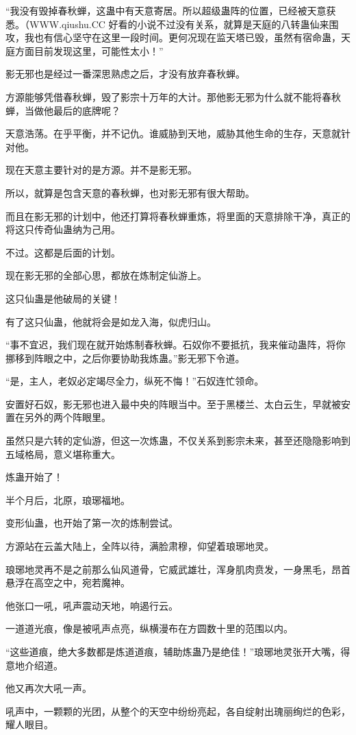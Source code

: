 \begin{this_body}
“我没有毁掉春秋蝉，这蛊中有天意寄居。所以超级蛊阵的位置，已经被天意获悉。（WWW.qiushu.CC 好看的小说不过没有关系，就算是天庭的八转蛊仙来围攻，我也有信心坚守在这里一段时间。更何况现在监天塔已毁，虽然有宿命蛊，天庭方面目前发现这里，可能性太小！”

影无邪也是经过一番深思熟虑之后，才没有放弃春秋蝉。

方源能够凭借春秋蝉，毁了影宗十万年的大计。那他影无邪为什么就不能将春秋蝉，当做他最后的底牌呢？

天意浩荡。在乎平衡，并不记仇。谁威胁到天地，威胁其他生命的生存，天意就针对他。

现在天意主要针对的是方源。并不是影无邪。

所以，就算是包含天意的春秋蝉，也对影无邪有很大帮助。

而且在影无邪的计划中，他还打算将春秋蝉重炼，将里面的天意排除干净，真正的将这只传奇仙蛊纳为己用。

不过。这都是后面的计划。

现在影无邪的全部心思，都放在炼制定仙游上。

这只仙蛊是他破局的关键！

有了这只仙蛊，他就将会是如龙入海，似虎归山。

“事不宜迟，我们现在就开始炼制春秋蝉。石奴你不要抵抗，我来催动蛊阵，将你挪移到阵眼之中，之后你要协助我炼蛊。”影无邪下令道。

“是，主人，老奴必定竭尽全力，纵死不悔！”石奴连忙领命。

安置好石奴，影无邪也进入最中央的阵眼当中。至于黑楼兰、太白云生，早就被安置在另外的两个阵眼里。

虽然只是六转的定仙游，但这一次炼蛊，不仅关系到影宗未来，甚至还隐隐影响到五域格局，意义堪称重大。

炼蛊开始了！

半个月后，北原，琅琊福地。

变形仙蛊，也开始了第一次的炼制尝试。

方源站在云盖大陆上，全阵以待，满脸肃穆，仰望着琅琊地灵。

琅琊地灵再不是之前那么仙风道骨，它威武雄壮，浑身肌肉贲发，一身黑毛，昂首悬浮在高空之中，宛若魔神。

他张口一吼，吼声震动天地，响遏行云。

一道道光痕，像是被吼声点亮，纵横漫布在方圆数十里的范围以内。

“这些道痕，绝大多数都是炼道道痕，辅助炼蛊乃是绝佳！”琅琊地灵张开大嘴，得意地介绍道。

他又再次大吼一声。

吼声中，一颗颗的光团，从整个的天空中纷纷亮起，各自绽射出瑰丽绚烂的色彩，耀人眼目。


\end{this_body}
